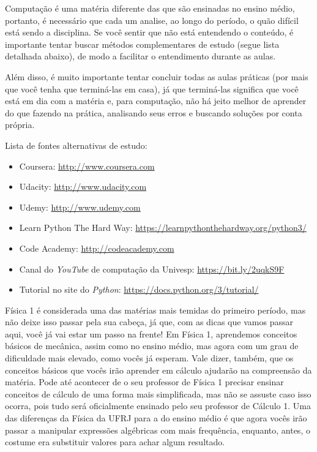        	Computação é uma matéria diferente das que são ensinadas no ensino médio, portanto, é necessário que cada um analise, ao longo do período, o quão difícil está sendo a disciplina. Se você sentir que não está entendendo o conteúdo, é importante tentar buscar métodos complementares de estudo (segue lista detalhada abaixo), de modo a facilitar o entendimento durante as aulas. 
            
            Além disso, é muito importante tentar concluir todas as aulas práticas (por mais que você tenha que terminá-las em casa), já que terminá-las significa que você está em dia com a matéria e, para computação, não há jeito melhor de aprender do que fazendo na prática, analisando seus erros e buscando soluções por conta própria.
            
            Lista de fontes alternativas de estudo:
            
            \begin{itemize}
            	\item Coursera: \href{http://www.coursera.com}{http://www.coursera.com}
                \item Udacity: \href{http://www.udacity.com}{http://www.udacity.com}
                \item Udemy: \href{http://www.udemy.com}{http://www.udemy.com}
                \item Learn Python The Hard Way: \href{https://learnpythonthehardway.org/python3/}{https://learnpythonthehardway.org/python3/}
                \item Code Academy: \href{http://codeacademy.com}{http://codeacademy.com}
                \item Canal do \textit{YouTube} de computação da Univesp: \href{https://bit.ly/2uqkS9F}{https://bit.ly/2uqkS9F}
                \item Tutorial no site do \textit{Python}: \href{https://docs.python.org/3/tutorial/}{https://docs.python.org/3/tutorial/}
            \end{itemize}

        
        Física 1 é considerada uma das matérias mais temidas do primeiro período, mas não deixe isso passar pela sua cabeça, já que, com as dicas que vamos passar aqui, você já vai estar um passo na frente!
        Em Física 1, aprendemos conceitos básicos de mecânica, assim como no ensino médio, mas agora com um grau de dificuldade mais elevado, como vocês já esperam. Vale dizer, também, que os conceitos básicos que vocês irão aprender em cálculo ajudarão na compreensão da matéria. Pode até acontecer de o seu professor de Física 1 precisar ensinar conceitos de cálculo de uma forma mais simplificada, mas não se assuste caso isso ocorra, pois tudo será oficialmente ensinado pelo seu professor de Cálculo 1.
        Uma das diferenças da Física da UFRJ para a do ensino médio é que agora vocês irão passar a manipular expressões algébricas com mais frequência, enquanto, antes, o costume era substituir valores para achar algum resultado.
        
